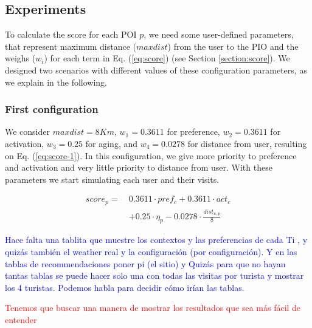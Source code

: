 \subsection{Experiments} \label{section:experiments}

To calculate the score for each POI $p$, we need some user-defined parameters, that represent maximum distance ($maxdist$) from the user to the PIO and the weighs ($w_i$) for each term in Eq. (\ref{eq:score})   (see Section \ref{section:score}). We designed two scenarios with different values of these configuration parameters, as we explain in the following.

\subsubsection{First configuration} 
\label{section:experiment-1}
We consider $maxdist =8 Km$, $w_1 = 0.3611$ for preference, $w_2 = 0.3611$ for activation, $w_3 = 0.25$ for aging, and $w_4 = 0.0278$ for distance from user, resulting on 
Eq. (\ref{eq:score-1}). In this configuration, we give
more priority to preference and activation and very little priority to distance from user. With these parameters we start simulating each user and their visits.

\begin{equation} \label{eq:score-1}
    \begin{split}
        score_p = \ &0.3611 \cdot pref_c + 0.3611 \cdot act_c \\
                                        &+ 0.25 \cdot \eta_p - 0.0278 \cdot \frac{dist_{u,p}}{8}
    \end{split}
\end{equation}


\textcolor{blue}{Hace falta una tablita que muestre los contextos y las preferencias de cada Ti , y quizás también el weather real y la configuración (por configuración).
Y en las tablas de recommendaciones poner pi (el sitio) y Quizás para que no hayan tantas tablas se puede hacer solo una con todas las visitas por turista y mostrar los 4 turistas. Podemos habla para decidir cómo irían las tablas.}

\textcolor{red}{Tenemos que buscar una manera de mostrar los resultados que sea más fácil de entender}

